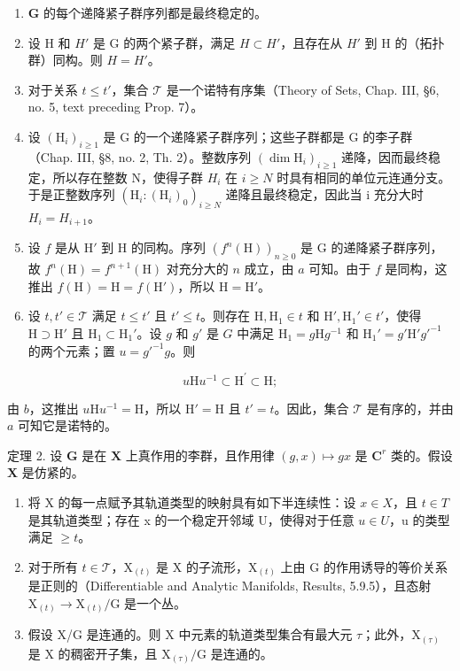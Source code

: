 \begin{enumerate}
\def\labelenumi{\alph{enumi})}
\item
  \(\mathbf{G}\) 的每个递降紧子群序列都是最终稳定的。
\item
  设 H 和 \(H'\) 是 G 的两个紧子群，满足 \(H \subset H'\)，且存在从 \(H'\) 到 H 的（拓扑群）同构。则 \(H = H'\)。
\item
  对于关系 \(t \leq t'\)，集合 \(\mathcal{T}\) 是一个诺特有序集（Theory of Sets, Chap. III, §6, no. 5, text preceding Prop. 7）。
\item
  设 \((\mathrm{H}_{i})_{i\geq1}\) 是 G 的一个递降紧子群序列；这些子群都是 G 的李子群（Chap. III, §8, no. 2, Th. 2）。整数序列 \((\dim\mathrm{H}_{i})_{i\geq1}\) 递降，因而最终稳定，所以存在整数 N，使得子群 \(H_{i}\) 在 \(i\geq N\) 时具有相同的单位元连通分支。于是正整数序列 \((\mathrm{H}_{i}:(\mathrm{H}_{i})_{0})_{i\geq N}\) 递降且最终稳定，因此当 i 充分大时 \(H_{i}=H_{i+1}\)。
\item
  设 \(f\) 是从 \(\mathrm{H}'\) 到 \(\mathrm{H}\) 的同构。序列 \((f^n(\mathrm{H}))_{n\geq 0}\) 是 \(\mathrm{G}\) 的递降紧子群序列，故 \(f^n(\mathrm{H}) = f^{n + 1}(\mathrm{H})\) 对充分大的 \(n\) 成立，由 \(a\) 可知。由于 \(f\) 是同构，这推出 \(f(\mathrm{H}) = \mathrm{H} = f(\mathrm{H}')\)，所以 \(\mathrm{H} = \mathrm{H}'\)。
\item
  设 \(t, t' \in \mathcal{T}\) 满足 \(t \leq t'\) 且 \(t' \leq t\)。则存在 \(\mathrm{H}, \mathrm{H}_1 \in t\) 和 \(\mathrm{H}', \mathrm{H}_1' \in t'\)，使得 \(\mathrm{H} \supset \mathrm{H}'\) 且 \(\mathrm{H}_1 \subset \mathrm{H}_1'\)。设 \(g\) 和 \(g'\) 是 \(G\) 中满足 \(\mathrm{H}_1 = g\mathrm{H}g^{-1}\) 和 \(\mathrm{H}_1' = g'\mathrm{H}'g'^{-1}\) 的两个元素；置 \(u = g'^{-1}g\)。则
\end{enumerate}

\[
u \mathrm{H} u ^ {- 1} \subset \mathrm{H} ^ {\prime} \subset \mathrm{H};
\]

由 \(b\)，这推出 \(u\mathrm{H}u^{-1} = \mathrm{H}\)，所以 \(\mathrm{H}' = \mathrm{H}\) 且 \(t' = t\)。因此，集合 \(\mathcal{T}\) 是有序的，并由 \(a\) 可知它是诺特的。

定理 2. 设 \(\mathbf{G}\) 是在 \(\mathbf{X}\) 上真作用的李群，且作用律 \((g,x)\mapsto gx\) 是 \(\mathbf{C}^r\) 类的。假设 \(\mathbf{X}\) 是仿紧的。

\begin{enumerate}
\def\labelenumi{\alph{enumi})}
\item
  将 X 的每一点赋予其轨道类型的映射具有如下半连续性：设 \(x \in X\)，且 \(t \in T\) 是其轨道类型；存在 x 的一个稳定开邻域 U，使得对于任意 \(u \in U\)，u 的类型满足 \(\geq t\)。
\item
  对于所有 \(t \in \mathcal{T}\)，\(\mathrm{X}_{(t)}\) 是 \(\mathrm{X}\) 的子流形，\(\mathrm{X}_{(t)}\) 上由 \(\mathrm{G}\) 的作用诱导的等价关系是正则的（Differentiable and Analytic Manifolds, Results, 5.9.5），且态射 \(\mathrm{X}_{(t)} \to \mathrm{X}_{(t)} / \mathrm{G}\) 是一个丛。
\item
  假设 X/G 是连通的。则 X 中元素的轨道类型集合有最大元 \(\tau\)；此外，\(\mathrm{X}_{(\tau)}\) 是 X 的稠密开子集，且 \(\mathrm{X}_{(\tau)}/\mathrm{G}\) 是连通的。
\end{enumerate}

